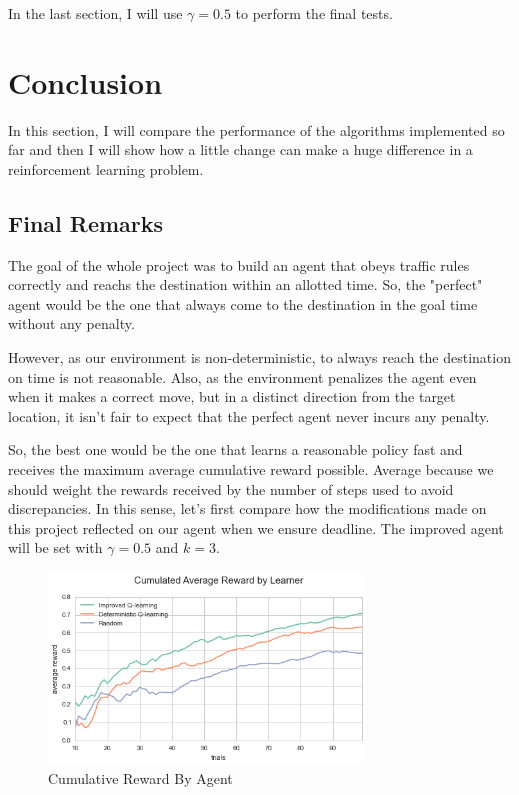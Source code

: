 \documentclass[a4paper]{article}
\begin{document}
In the last section, I will use $\gamma = 0.5$ to perform the final tests.


\section{Conclusion}
\label{sec:conclusion}
In this section, I will compare the performance of the algorithms implemented so far and then I will show how a little change can make a huge difference in a reinforcement learning problem.

\subsection{Final Remarks}
The goal of the whole project was to build an agent that obeys traffic rules correctly and reachs the destination within an allotted time. So, the "perfect" agent would be the one that always come to the destination in the goal time without any penalty.

However, as our environment is non-deterministic, to always reach the destination on time is not reasonable. Also, as the environment penalizes the agent even when it makes a correct move, but in a distinct direction from the target location, it isn't fair to expect that the perfect agent never incurs any penalty.

So, the best one would be the one that learns a reasonable policy fast and receives the maximum average cumulative reward possible. Average because we should weight the rewards received by the number of steps used to avoid discrepancies. In this sense, let's first compare how the modifications made on this project reflected on our agent when we ensure deadline. The improved agent will be set with $\gamma=0.5$ and $k=3$.


\begin{figure}[ht!]
\centering
\includegraphics[width=0.75\textwidth]{images/performance_comparition.png}
\caption{\label{fig:perf_compr}Cumulative Reward By Agent}
\end{figure}
\end{document}
